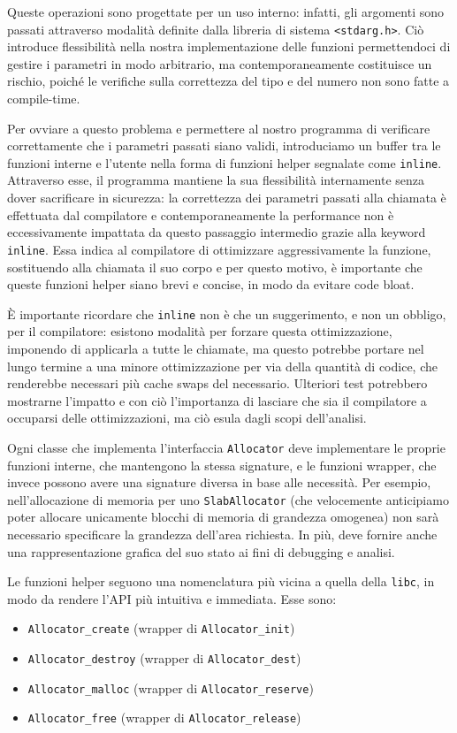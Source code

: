 Queste operazioni sono progettate per un uso interno: infatti, gli argomenti sono passati attraverso modalità definite dalla libreria di sistema \texttt{<stdarg.h>}. Ciò introduce flessibilità nella nostra implementazione delle funzioni permettendoci di gestire i parametri in modo arbitrario, ma contemporaneamente costituisce un rischio, poiché le verifiche sulla correttezza del tipo e del numero non sono fatte a compile-time.

Per ovviare a questo problema e permettere al nostro programma di verificare correttamente che i parametri passati siano validi, introduciamo un buffer tra le funzioni interne e l’utente nella forma di funzioni helper segnalate come \texttt{inline}. Attraverso esse, il programma mantiene la sua flessibilità internamente senza dover sacrificare in sicurezza: la correttezza dei parametri passati alla chiamata è effettuata dal compilatore e contemporaneamente la performance non è eccessivamente impattata da questo passaggio intermedio grazie alla keyword \texttt{inline}. Essa indica al compilatore di ottimizzare aggressivamente la funzione, sostituendo alla chiamata il suo corpo e per questo motivo, è importante che queste funzioni helper siano brevi e concise, in modo da evitare code bloat.

È importante ricordare che \texttt{inline} non è che un suggerimento, e non un obbligo, per il compilatore: esistono modalità per forzare questa ottimizzazione, imponendo di applicarla a tutte le chiamate, ma questo potrebbe portare nel lungo termine a una minore ottimizzazione per via della quantità di codice, che renderebbe necessari più cache swaps del necessario. Ulteriori test potrebbero mostrarne l’impatto e con ciò l’importanza di lasciare che sia il compilatore a occuparsi delle ottimizzazioni, ma ciò esula dagli scopi dell’analisi.

Ogni classe che implementa l’interfaccia \texttt{Allocator} deve implementare le proprie funzioni interne, che mantengono la stessa signature, e le funzioni wrapper, che invece possono avere una signature diversa in base alle necessità. Per esempio, nell’allocazione di memoria per uno \texttt{SlabAllocator} (che velocemente anticipiamo poter allocare unicamente blocchi di memoria di grandezza omogenea) non sarà necessario specificare la grandezza dell’area richiesta. In più, deve fornire anche una rappresentazione grafica del suo stato ai fini di debugging e analisi.

Le funzioni helper seguono una nomenclatura più vicina a quella della \texttt{libc}, in modo da rendere l’API più intuitiva e immediata. Esse sono:
\begin{itemize}
  \item \texttt{Allocator\_create} (wrapper di \texttt{Allocator\_init})
  \item \texttt{Allocator\_destroy} (wrapper di \texttt{Allocator\_dest})
  \item \texttt{Allocator\_malloc} (wrapper di \texttt{Allocator\_reserve})
  \item \texttt{Allocator\_free} (wrapper di \texttt{Allocator\_release})
\end{itemize}

